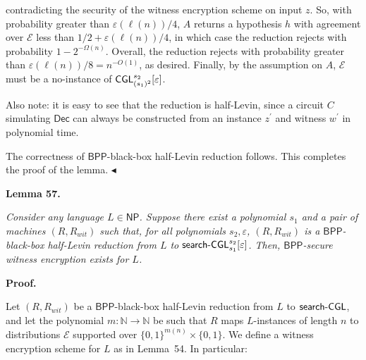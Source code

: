 contradicting the security of the witness encryption scheme on input $z$. So, with probability greater than $\varepsilon(\ell(n))/4$, $A$ returns a hypothesis $h$ with agreement over $\mathcal{E}$ less than $1/2+\varepsilon(\ell(n))/4$, in which case the reduction rejects with probability $1-2^{-\Omega(n)}$. Overall, the reduction rejects with probability greater than $\varepsilon(\ell(n))/8=n^{-O(1)}$, as desired. Finally, by the assumption on $A$, $\mathcal{E}$ must be a no-instance of ${\sf CGL}_{(s_{1})^{2}}^{s_{2}}[\varepsilon]$.\par




Also note: it is easy to see that the reduction is half-Levin, since a circuit $C$ simulating ${\mathsf{Dec}}$ can always be constructed from an instance $z^{\prime}$ and witness $w^{\prime}$ in polynomial time.\par




The correctness of ${\mathsf{BPP}}$-black-box half-Levin reduction follows. This completes the proof of the lemma.
$\blacktriangleleft$\par





\par\medskip\noindent\textbf{
\textbf{Lemma 57}\textbf{.}
}\par



\emph{Consider any language $L\in{\mathsf{NP}}$. Suppose there exist a polynomial $s_{1}$ and a pair of machines $(R,R_{wit})$ such that, for all polynomials $s_{2},\varepsilon$, $(R,R_{wit})$ is a ${\mathsf{BPP}}$-black-box half-Levin reduction from $L$ to ${\sf search}\text{-}{\sf CGL}_{s_{1}}^{s_{2}}[\varepsilon]$. Then, ${\mathsf{BPP}}$-secure witness encryption exists for $L$.}\par







\par\medskip\noindent\textbf{Proof.}\par




Let $(R,R_{wit})$ be a ${\mathsf{BPP}}$-black-box half-Levin reduction from $L$ to ${\sf search}\text{-}{\sf CGL}$, and let the polynomial $m:\mathbb{N}\to\mathbb{N}$ be such that $R$ maps $L$-instances of length $n$ to distributions $\mathcal{E}$ supported over $\{0,1\}^{m(n)}\times\{0,1\}$. We define a witness encryption scheme for $L$ as in Lemma 54. In particular:\par




